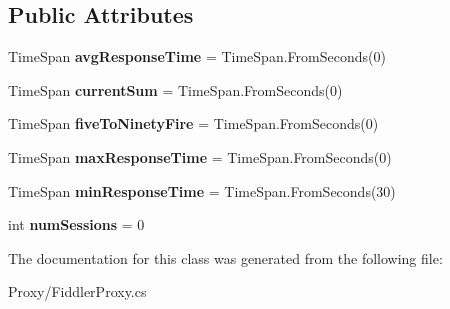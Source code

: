 \subsection*{Public Attributes}
\begin{DoxyCompactItemize}
\item 
\hypertarget{class_proto_test_1_1_golem_1_1_proxy_1_1_fiddler_proxy_a4871a48f4234e60089a8f77c981234cf}{Time\-Span {\bfseries avg\-Response\-Time} = Time\-Span.\-From\-Seconds(0)}\label{class_proto_test_1_1_golem_1_1_proxy_1_1_fiddler_proxy_a4871a48f4234e60089a8f77c981234cf}

\item 
\hypertarget{class_proto_test_1_1_golem_1_1_proxy_1_1_fiddler_proxy_a405d6bd6bf4d49543a509c9d5f8c8414}{Time\-Span {\bfseries current\-Sum} = Time\-Span.\-From\-Seconds(0)}\label{class_proto_test_1_1_golem_1_1_proxy_1_1_fiddler_proxy_a405d6bd6bf4d49543a509c9d5f8c8414}

\item 
\hypertarget{class_proto_test_1_1_golem_1_1_proxy_1_1_fiddler_proxy_a48dc24264393469c9032fda8d003bccc}{Time\-Span {\bfseries five\-To\-Ninety\-Fire} = Time\-Span.\-From\-Seconds(0)}\label{class_proto_test_1_1_golem_1_1_proxy_1_1_fiddler_proxy_a48dc24264393469c9032fda8d003bccc}

\item 
\hypertarget{class_proto_test_1_1_golem_1_1_proxy_1_1_fiddler_proxy_a14067834f00f42ebc5e973285fc4dc1a}{Time\-Span {\bfseries max\-Response\-Time} = Time\-Span.\-From\-Seconds(0)}\label{class_proto_test_1_1_golem_1_1_proxy_1_1_fiddler_proxy_a14067834f00f42ebc5e973285fc4dc1a}

\item 
\hypertarget{class_proto_test_1_1_golem_1_1_proxy_1_1_fiddler_proxy_a36ca306a8ccee60088fb8dbd5f15e2ce}{Time\-Span {\bfseries min\-Response\-Time} = Time\-Span.\-From\-Seconds(30)}\label{class_proto_test_1_1_golem_1_1_proxy_1_1_fiddler_proxy_a36ca306a8ccee60088fb8dbd5f15e2ce}

\item 
\hypertarget{class_proto_test_1_1_golem_1_1_proxy_1_1_fiddler_proxy_aca6b29e42918d18adf3998566456c988}{int {\bfseries num\-Sessions} = 0}\label{class_proto_test_1_1_golem_1_1_proxy_1_1_fiddler_proxy_aca6b29e42918d18adf3998566456c988}

\end{DoxyCompactItemize}


The documentation for this class was generated from the following file\-:\begin{DoxyCompactItemize}
\item 
Proxy/Fiddler\-Proxy.\-cs\end{DoxyCompactItemize}

